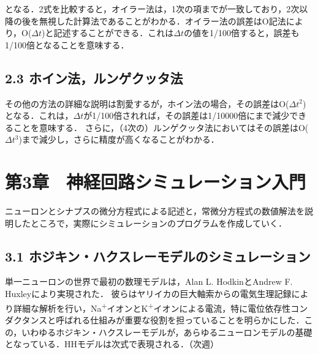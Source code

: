 \documentclass[dvipdfmx, A4j, twocolumn, 10.5pt]{jsarticle}
\begin{document}
となる．2式を比較すると，オイラー法は，1次の項までが一致しており，2次以降の後を無視した計算法であることがわかる．オイラー法の誤差はO記法により，O($\Delta t$)と記述することができる．これは$\Delta t$の値を1/100倍すると，誤差も1/100倍となることを意味する．

\subsection*{2.3 ホイン法，ルンゲクッタ法}
その他の方法の詳細な説明は割愛するが，ホイン法の場合，その誤差はO($\Delta t^2$)となる．これは，$\Delta t$が1/100倍されれば，その誤差は1/10000倍にまで減少できることを意味する．
さらに，（4次の）ルンゲクッタ法においてはその誤差はO($\Delta t^3$)まで減少し，さらに精度が高くなることがわかる．

\section*{第3章　神経回路シミュレーション入門}

ニューロンとシナプスの微分方程式による記述と，常微分方程式の数値解法を説明したところで，実際にシミュレーションのプログラムを作成していく．

\subsection*{3.1 ホジキン・ハクスレーモデルのシミュレーション}
単一ニューロンの世界で最初の数理モデルは，Alan L. HodkinとAndrew F. Huxleyにより実現された．
彼らはヤリイカの巨大軸索からの電気生理記録により詳細な解析を行い，Na\textsuperscript{+}イオンとK\textsuperscript{+}イオンによる電流，特に電位依存性コンダクタンスと呼ばれる仕組みが重要な役割を担っていることを明らかにした．この，いわゆるホジキン・ハクスレーモデルが，あらゆるニューロンモデルの基礎となっている．HHモデルは次式で表現される．（次週）
\end{document}
